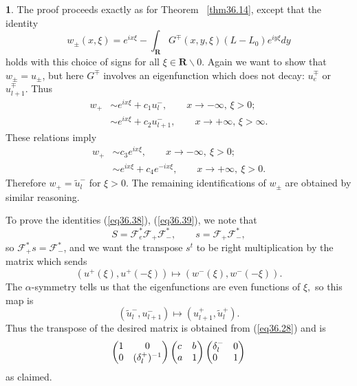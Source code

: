 \documentclass{surv-l}
\theoremstyle{plain}
\theoremstyle{definition}
\newtheorem*{sop}{\sc{Sketch of Proof}}
\numberwithin{equation}{chapter}
\begin{document}
\begin{sop} The proof proceeds exactly as for Theorem ~\ref{thm36.14}, except that the identity
\begin{equation}
w_{\pm}(x, \xi)=e^{ix\xi}-\int_{\mathbf{R}}G^{\mp}(x, y,\xi)(L-L_{0})e^{iy\xi}dy
\end{equation}
holds with this choice of signs for all $\xi\in \mathbf{R}\backslash 0$. Again we want to show that $w_{\pm}=u_{\pm}$, but here $ G^{\mp}$ involves an eigenfunction which does not decay: $u_{e}^{\mp}$ or $u_{l+1}^{\mp}$. Thus
\begin{align*}
w_{+}&\sim e^{ix\xi}+c_{1}u_{l}^{-},\qquad x\rightarrow-\infty,\,\xi>0;\\
&\sim e^{ix\xi}+c_{2}u_{l+1}^{-},\qquad x\rightarrow +\infty,\,\xi>\infty.
\end{align*}
These relations imply
\begin{align*}
w_{+}&\sim c_{3}e^{ix\xi},\qquad x\rightarrow-\infty,\ \xi>0;\\
&\sim e^{ix\xi}+c_{4}e^{-ix\xi},\qquad x\rightarrow +\infty,\ \xi>0.
\end{align*}
Therefore $w_{+}=\tilde{u}_{l}^{-}$ for $\xi>0$. The remaining identifications of $w_{\pm}$ are obtained by similar reasoning.

To prove the identities (\ref{eq36.38}), (\ref{eq36.39}), we note that
\begin{equation*}
S=\mathscr{F}_{e}^{*}\mathscr{F}_{+}\mathscr{F}_{-}^{*},\qquad s=\mathscr{F}_{+}\mathscr{F}_{-}^{*},
\end{equation*}
so $\mathscr{F}_{+}^{*}s=\mathscr{F}_{-}^{*}$, and we want the transpose $s^{t}$ to be right multiplication by the matrix which sends
\begin{equation*}
(u^{+}(\xi), u^{+}(-\xi))\mapsto(w^{-}(\xi),w^{-}(-\xi)).
\end{equation*}
The $\alpha$-symmetry tells us that the eigenfunctions are even functions of $\xi,$ so this map is
\begin{equation*}
(\tilde{u}_{l}^{-},u_{l+1}^{-})\mapsto(u_{l+1}^{+},\tilde{u}_{l}^{+}).
\end{equation*}
Thus the transpose of the desired matrix is obtained from (\ref{eq36.28}) and is
\begin{equation}
\left(\begin{array}{@{}cc@{}}
1 & 0\\
0 & (\delta_{l}^{+})^{-1}
\end{array}\right)\left(\begin{array}{@{}ll@{}}
c & b\\
a & 1
\end{array}\right)\left(\begin{array}{@{}ll@{}}
\delta_{l}^{-} & 0\\
0 & 1
\end{array}\right)
\end{equation}
as claimed.
\end{sop}
\end{document}

